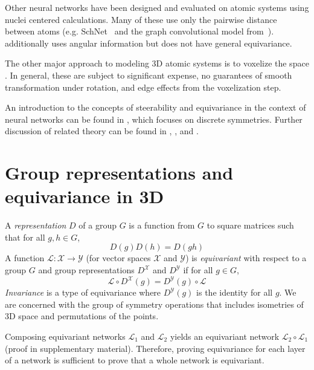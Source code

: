 \documentclass{article}
\begin{document}
Other neural networks have been designed and evaluated on atomic systems using nuclei centered calculations. Many of these use only the pairwise distance between atoms (e.g. SchNet~\citep{2017arXiv170608566S} and the graph convolutional model from~\citet{faber2017prediction}). \citet{ANI1} additionally uses angular information but does not have general equivariance. %

The other major approach to modeling 3D atomic systems is to voxelize the space \citep{DBLP:journals/corr/WallachDH15,NIPS2017_6935,Torng2017}. In general, these are subject to significant expense, no guarantees of smooth transformation under rotation, and edge effects from the voxelization step.

An introduction to the concepts of steerability and equivariance in the context of neural networks can be found in \citet{steerable_cnns}, which focuses on discrete symmetries.  Further discussion of related theory can be found in \citep{kondor2018generalization}, \citep{kondor2018n}, and \citep{cohen2018intertwiners}.

\section{Group representations and equivariance in 3D}\label{sec:equivariance}

A {\em representation} $D$ of a group $G$ is a function from $G$ to square matrices such that for all $g, h\in G$, \[D(g)D(h) = D(gh)\]  A function $\mathcal{L} : \mathcal{X} \rightarrow \mathcal{Y}$ (for vector spaces $\mathcal{X}$ and $\mathcal{Y}$) is {\em equivariant} with respect to a group $G$ and group representations $D^\mathcal{X}$ and $D^\mathcal{Y}$ if for all $g\in G$, 
\[\mathcal{L} \circ D^\mathcal{X}(g) = D^\mathcal{Y}(g) \circ \mathcal{L}\]
{\em Invariance} is a type of equivariance where $D^\mathcal{Y}(g)$ is the identity for all $g$.
We are concerned with the group of symmetry operations that includes isometries of 3D space and permutations of the points.

Composing equivariant networks $\mathcal{L}_1$ and $\mathcal{L}_2$ yields an equivariant network $\mathcal{L}_2 \circ \mathcal{L}_1$ (proof in supplementary material).
Therefore, proving equivariance for each layer of a network is sufficient to prove %
that a whole network is equivariant.
\end{document}

